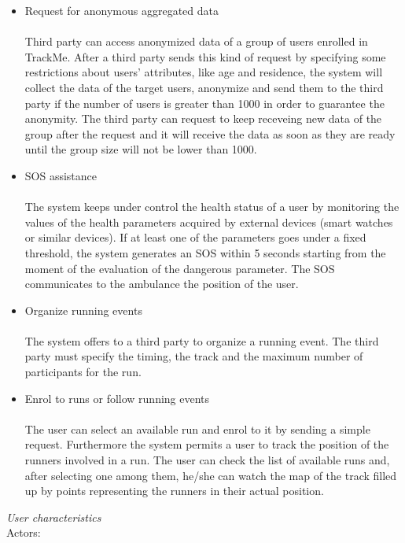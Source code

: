 \documentclass{article}
\begin{document}
\begin{legal}
\begin{legal}
{\begin{itemize}
		\item Request for anonymous aggregated data\\\\
		Third party can access anonymized data of a group of users enrolled in TrackMe. After a third party sends this kind of request by specifying some restrictions about users’ attributes, like age and residence, the system will collect the data of the target users, anonymize and send them to the third party if the number of users is greater than 1000 in order to guarantee the anonymity. The third party can request to keep receveing new data of the group after the request and it will receive the data as soon as they are ready until the group size will not be lower than 1000.\\
		\item SOS assistance\\\\
		The system keeps under control the health status of a user by monitoring the values of the health parameters acquired by external devices (smart watches or similar devices). If at least one of the parameters goes under a fixed threshold, the system generates an SOS within 5 seconds starting from the moment of the evaluation of the dangerous parameter. The SOS communicates to the ambulance the position of the user.\\
		\item Organize running events\\\\
		The system offers to a third party to organize a running event. The third party must specify the timing, the track and the maximum number of participants for the run.\\
		\item Enrol to runs or follow running events\\\\
		The user can select an available run and enrol to it by sending a simple request. Furthermore the system permits a user to track the position of the runners involved in a run. The user can check the list of available runs and, after selecting one among them, he/she can watch the map of the track filled up by points representing the runners in their actual position. \\
		\end{itemize}
		}
		\item \textit{User characteristics} \\
			{\normalfont
			Actors:\\
}
\end{legal}
\end{legal}
\end{document}
